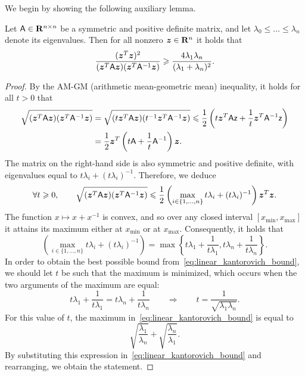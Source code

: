 We begin by showing the following auxiliary lemma.
\begin{lemma}
    Let $\mathsf A \in \mathbf R^{n \times n}$ be a symmetric and positive definite matrix,
    and let $\lambda_0 \leq \dots \leq \lambda_n$ denote its eigenvalues.
    Then for all nonzero $\mathbf{\boldsymbol{z}} \in \mathbf R^n$ it holds that
    \[
        \frac{(\mathbf{\boldsymbol{z}}^T \mathbf{\boldsymbol{z}})^2}{(\mathbf{\boldsymbol{z}}^T \mathsf A \mathbf{\boldsymbol{z}}) (\mathbf{\boldsymbol{z}}^T \mathsf A^{-1} \mathbf{\boldsymbol{z}})}
        \geqslant \frac{4\lambda_1 \lambda_n}{(\lambda_1 + \lambda_n)^2}.
    \]
\end{lemma}
\begin{proof}
    By the AM-GM (arithmetic mean-geometric mean) inequality,
    it holds for all $t > 0$ that
    \begin{align*}
        \sqrt{(\mathbf{\boldsymbol{z}}^T \mathsf A \mathbf{\boldsymbol{z}}) (\mathbf{\boldsymbol{z}}^T \mathsf A^{-1} \mathbf{\boldsymbol{z}})}
        &= \sqrt{(t\mathbf{\boldsymbol{z}}^T \mathsf A \mathbf{\boldsymbol{z}}) (t^{-1} \mathbf{\boldsymbol{z}}^T \mathsf A^{-1} \mathbf{\boldsymbol{z}})}
        \leqslant \frac{1}{2} \left( t \mathbf{\boldsymbol{z}}^T \mathsf A \mathsf z + \frac{1}{t} \mathbf{\boldsymbol{z}}^T \mathsf A^{-1} \mathsf z \right) \\
        &= \frac{1}{2} \mathbf{\boldsymbol{z}}^T \left( t \mathsf A + \frac{1}{t} \mathsf A^{-1} \right) \mathbf{\boldsymbol{z}}.
    \end{align*}
    The matrix on the right-hand side is also symmetric and positive definite,
    with eigenvalues equal to $t \lambda_i + (t \lambda_i)^{-1}$.
    Therefore, we deduce
    \begin{equation}
        \label{eq:linear_kantorovich_bound}
        \forall t \geqslant 0, \qquad
        \sqrt{(\mathbf{\boldsymbol{z}}^T \mathsf A \mathbf{\boldsymbol{z}}) (\mathbf{\boldsymbol{z}}^T \mathsf A^{-1} \mathbf{\boldsymbol{z}})}
        \leqslant \frac{1}{2} \left( \max_{i \in \{1, \dotsc, n\}} t \lambda_i + (t \lambda_i)^{-1} \right) \mathbf{\boldsymbol{z}}^T \mathbf{\boldsymbol{z}}.
    \end{equation}
    The function $x \mapsto x + x^{-1}$ is convex,
    and so over any closed interval $[x_{\min}, x_{\max}]$
    it attains its maximum either at $x_{\min}$ or at $x_{\max}$.
    Consequently, it holds that
    \begin{equation*}
        \left( \max_{i \in \{1, \dotsc, n\}} t \lambda_i + (t \lambda_i)^{-1} \right)
        = \max \left\{ t \lambda_{1} + \frac{1}{t \lambda_{1}}, t \lambda_{n} + \frac{1}{t \lambda_{n}} \right\}.
    \end{equation*}
    In order to obtain the best possible bound from~\eqref{eq:linear_kantorovich_bound},
    we should let $t$ be such that the maximum is minimized,
    which occurs when the two arguments of the maximum are equal:
    \[
            t \lambda_{1} + \frac{1}{t \lambda_{1}} = t \lambda_{n} + \frac{1}{t \lambda_{n}}
            \qquad \Rightarrow \qquad t = \frac{1}{\sqrt{\lambda_{1} \lambda_{n}}}.
    \]
    For this value of $t$,
    the maximum in~\eqref{eq:linear_kantorovich_bound} is equal to
    \[
        \sqrt{\frac{\lambda_1}{\lambda_{n}}} + \sqrt{\frac{\lambda_{n}}{\lambda_1}}.
    \]
    By substituting this expression in~\eqref{eq:linear_kantorovich_bound} and rearranging,
    we obtain the statement.
\end{proof}

